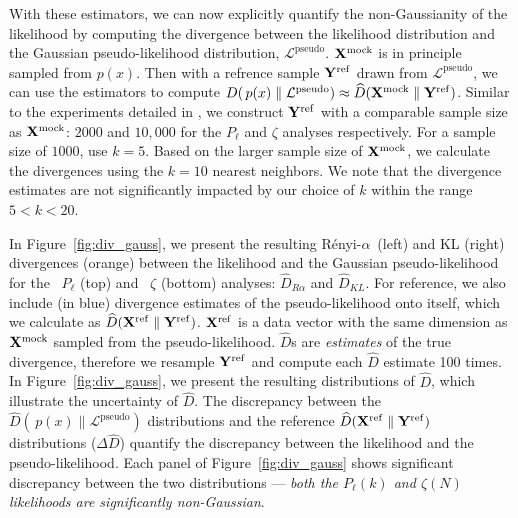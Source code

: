 \documentclass[12pt, letterpaper, preprint]{aastex}
\newcommand{\Nd}{{100}\xspace}
\newcommand{\Xmock}{{\bf X}^\mathrm{mock}}
\newcommand{\Xref}{{\bf X}^\mathrm{ref}}
\newcommand{\Yref}{{\bf Y}^\mathrm{ref}}
\newcommand{\Ralpha}{R\'enyi-$\alpha$}
\newcommand{\Beut}{\citetalias{beutler2017}\xspace}
\newcommand{\Sinh}{\citetalias{sinha2017}\xspace}
\begin{document}
With these estimators, we can now explicitly quantify the 
non-Gaussianity of the likelihood by computing the divergence 
between the likelihood distribution and the Gaussian 
pseudo-likelihood distribution, $\mathcal{L}^\mathrm{pseudo}$.
$\Xmock$ is in principle sampled from $p(x)$. Then with a refrence 
sample ${\bf Y}^\mathrm{ref}$ drawn from $\mathcal{L}^\mathrm{pseudo}$, 
we can use the estimators to compute 
$D(\, p(x) \parallel \mathcal{L}^\mathrm{pseudo}) \approx \widehat{D}(\Xmock \parallel {\bf Y}^\mathrm{ref})$. %
Similar to the experiments detailed in \cite{poczos2012},
we construct ${\bf Y}^\mathrm{ref}$ with a comparable sample size as $\Xmock$:
$2000$ and $10,000$ for the $P_\ell$ and $\zeta$ analyses respectively.
For a sample size of $1000$, \cite{sutherland2012} use $k=5$. Based on the 
larger sample size of $\Xmock$, we calculate the divergences using the $k=10$ 
nearest neighbors. We note that the divergence estimates are not significantly 
impacted by our choice of $k$ within the range $5 < k < 20$.

In Figure~\ref{fig:div_gauss}, we present the resulting \Ralpha~(left) 
and KL (right) divergences (orange) between the likelihood and the 
Gaussian pseudo-likelihood for the \Beut~$P_\ell$ (top) and \Sinh~$\zeta$ (bottom) 
analyses: $\widehat{D}_{R\alpha}$ and $\widehat{D}_{KL}$. For reference, we also 
include (in blue) divergence estimates of the pseudo-likelihood onto itself, 
which we calculate as $\widehat{D}(\Xref \parallel \Yref)$. $\Xref$ is a 
data vector with the same dimension as $\Xmock$ sampled from the pseudo-likelihood. 
$\widehat{D}$s are \emph{estimates} of the true divergence, therefore we 
resample $\Yref$ and compute each $\widehat{D}$ estimate \Nd times. 
In Figure~\ref{fig:div_gauss}, we present the resulting distributions of $\widehat{D}$,
which illustrate the uncertainty of $\widehat{D}$. The discrepancy between 
the $\widehat{D}(\, p(x) \parallel \mathcal{L}^\mathrm{pseudo})$
distributions and the reference $\widehat{D}(\Xref \parallel \Yref)$ distributions 
($\Delta \widehat{D}$) quantify the discrepancy between the likelihood
and the pseudo-likelihood. Each panel of Figure~\ref{fig:div_gauss} shows significant 
discrepancy between the two distributions --- \emph{both 
the $P_\ell(k)$ and $\zeta(N)$ likelihoods are significantly non-Gaussian}. 
\end{document}

